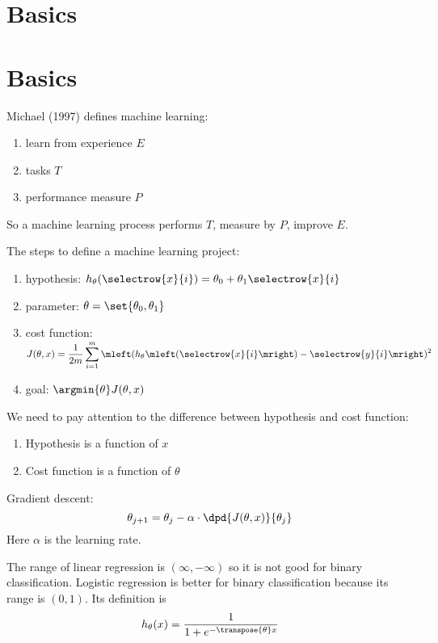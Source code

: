 \section{Basics}



\section{Basics}

Michael (1997) defines machine learning:
\begin{enumerate}
    \item learn from experience $E$
    \item tasks $T$
    \item performance measure $P$
\end{enumerate}

So a machine learning process performs $T$, measure by $P$, improve $E$.


The steps to define a machine learning project:
\begin{enumerate}
    \item hypothesis: $h_\theta ( \selectrow{x}{i} ) = \theta_0 + \theta_1 \selectrow{x}{i}$
    \item parameter: $\theta = \set{\theta_0, \theta_1}$
    \item cost function: $\displaystyle J(\theta, x) = \frac{1}{2m} \sum_{i=1}^m \mleft( h_\theta  \mleft(\selectrow{x}{i}\mright) - \selectrow{y}{i} \mright)^2$
    \item goal: $\displaystyle \argmin{\theta}  J(\theta,x)$
\end{enumerate}

We need to pay attention to the difference between hypothesis and cost function:
\begin{enumerate}
    \item Hypothesis is a function of $x$
    \item Cost function is a function of $\theta$
\end{enumerate}

Gradient descent:
\begin{equation}
    \theta_{j+1} = \theta_j - \alpha  \cdot \dpd{J(\theta, x)}{\theta_j}
\end{equation}
Here $\alpha$ is the learning rate.


The range of linear regression is $(\infty, -\infty)$ so it is not good for binary classification. Logistic regression is better for binary classification because its range is $(0, 1)$. Its definition is 
\begin{equation}
    h_\theta(x) = \frac{1}{1 + e^{- \transpose{\theta} x}}
\end{equation}

